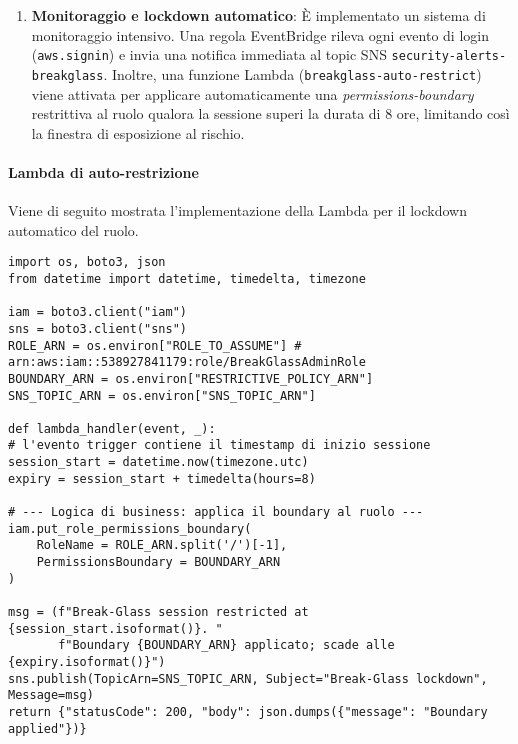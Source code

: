 \begin{enumerate}
\item \textbf{Monitoraggio e lockdown \-automatico}:
È implementato un sistema di monitoraggio intensivo. Una regola EventBridge rileva ogni evento di login (\lstinline|aws.signin|) e invia una notifica immediata al topic SNS \texttt{security-alerts-breakglass}. Inoltre, una funzione Lambda (\texttt{breakglass-auto-restrict}) viene attivata per applicare automaticamente una \emph{permissions-boundary} restrittiva al ruolo qualora la sessione superi la durata di 8 ore, limitando così la finestra di esposizione al rischio.

\end{enumerate}

\paragraph{Lambda di auto-restrizione}
Viene di seguito mostrata l'implementazione della Lambda per il lockdown automatico del ruolo.
\begin{lstlisting}[style=python, caption={Lambda semplificata di auto-lock del ruolo}, label=lst:breakglass-lambda]
import os, boto3, json
from datetime import datetime, timedelta, timezone

iam = boto3.client("iam")
sns = boto3.client("sns")
ROLE_ARN = os.environ["ROLE_TO_ASSUME"] # arn:aws:iam::538927841179:role/BreakGlassAdminRole
BOUNDARY_ARN = os.environ["RESTRICTIVE_POLICY_ARN"]
SNS_TOPIC_ARN = os.environ["SNS_TOPIC_ARN"]

def lambda_handler(event, _):
# l'evento trigger contiene il timestamp di inizio sessione
session_start = datetime.now(timezone.utc)
expiry = session_start + timedelta(hours=8)

# --- Logica di business: applica il boundary al ruolo ---
iam.put_role_permissions_boundary(
    RoleName = ROLE_ARN.split('/')[-1],
    PermissionsBoundary = BOUNDARY_ARN
)

msg = (f"Break-Glass session restricted at {session_start.isoformat()}. "
       f"Boundary {BOUNDARY_ARN} applicato; scade alle {expiry.isoformat()}")
sns.publish(TopicArn=SNS_TOPIC_ARN, Subject="Break-Glass lockdown", Message=msg)
return {"statusCode": 200, "body": json.dumps({"message": "Boundary applied"})}


\end{lstlisting}

